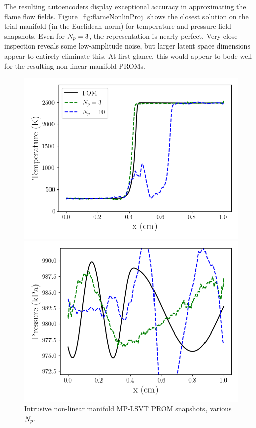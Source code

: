 The resulting autoencoders display exceptional accuracy in approximating the flame flow fields. Figure~\ref{fig:flameNonlinProj} shows the closest solution on the trial manifold (in the Euclidean norm) for temperature and pressure field snapshots. Even for $N_p = 3$, the representation is nearly perfect. Very close inspection reveals some low-amplitude noise, but larger latent space dimensions appear to entirely eliminate this. At first glance, this would appear to bode well for the resulting non-linear manifold PROMs.

\begin{figure}
    \begin{minipage}{0.49\linewidth}
        \includegraphics[width=0.99\linewidth]{Chapters/TransientFlame/Images/nonlinear/rom_temp_snaps.png}
    \end{minipage}
    \begin{minipage}{0.49\linewidth}
        \includegraphics[width=0.99\linewidth]{Chapters/TransientFlame/Images/nonlinear/rom_press_snaps.png}
    \end{minipage}
    \caption{\label{fig:flameNonlinROM}Intrusive non-linear manifold MP-LSVT PROM snapshots, various $N_p$.}
\end{figure}

